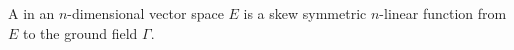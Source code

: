 A  in an $n$-dimensional vector space $E$ is a skew symmetric $n$-linear function from $E$ to the ground field $\Gamma$.
